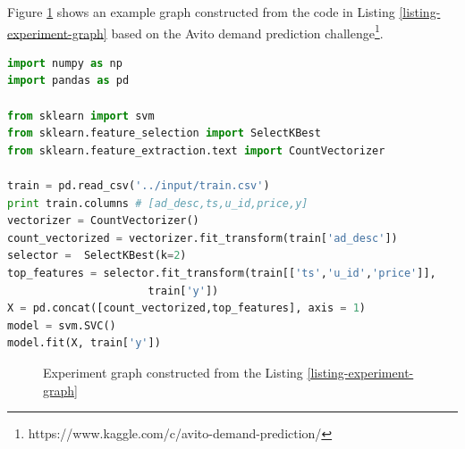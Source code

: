 %

Figure \ref{fig-experiment-graph} shows an example graph constructed from the code in Listing \ref{listing-experiment-graph} based on the Avito demand prediction challenge\footnote{https://www.kaggle.com/c/avito-demand-prediction/}.

\begin{lstlisting}[language=Python, caption=Example script,captionpos=b,label = {listing-experiment-graph}]
import numpy as np
import pandas as pd

from sklearn import svm
from sklearn.feature_selection import SelectKBest
from sklearn.feature_extraction.text import CountVectorizer

train = pd.read_csv('../input/train.csv') 
print train.columns # [ad_desc,ts,u_id,price,y]
vectorizer = CountVectorizer()
count_vectorized = vectorizer.fit_transform(train['ad_desc'])
selector =  SelectKBest(k=2)
top_features = selector.fit_transform(train[['ts','u_id','price']], 
				      train['y'])
X = pd.concat([count_vectorized,top_features], axis = 1)
model = svm.SVC()
model.fit(X, train['y'])
\end{lstlisting}

\begin{figure}
\centering

\caption{Experiment graph constructed from the Listing \ref{listing-experiment-graph}}
\label{fig-experiment-graph}
\end{figure}

